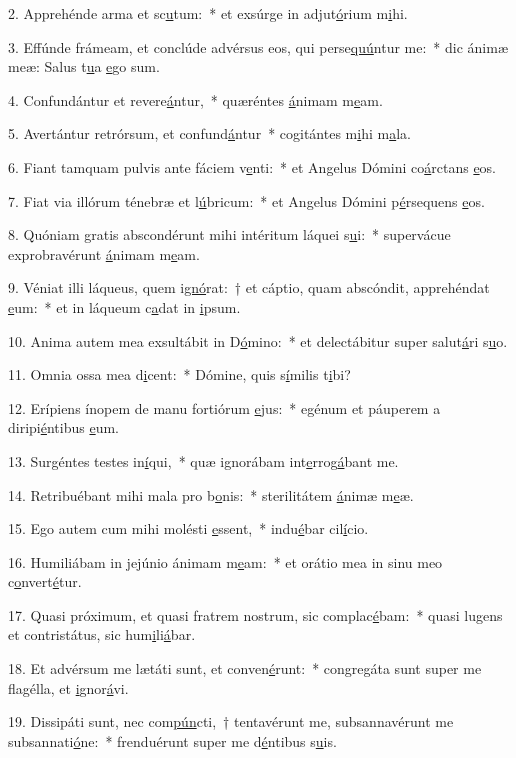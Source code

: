 2. Apprehénde arma et sc\uline{u}tum:~* et exsúrge in adjut\uline{ó}rium m\uline{i}hi.\par 
3. Effúnde frámeam, et conclúde advérsus eos, qui perse\uline{quú}ntur me:~* dic ánimæ meæ: Salus t\uline{u}a \uline{e}go sum.\par 
4. Confundántur et revere\uline{á}ntur,~* quæréntes \uline{á}nimam m\uline{e}am.\par 
5. Avertántur retrórsum, et confund\uline{á}ntur~* cogitántes m\uline{i}hi m\uline{a}la.\par 
6. Fiant tamquam pulvis ante fáciem v\uline{e}nti:~* et Angelus Dómini co\uline{á}rctans \uline{e}os.\par 
7. Fiat via illórum ténebræ et l\uline{ú}bricum:~* et Angelus Dómini p\uline{é}rsequens \uline{e}os.\par 
8. Quóniam gratis abscondérunt mihi intéritum láquei s\uline{u}i:~* supervácue exprobravérunt \uline{á}nimam m\uline{e}am.\par 
9. Véniat illi láqueus, quem i\uline{gnó}rat:~† et cáptio, quam abscóndit, apprehéndat \uline{e}um:~* et in láqueum c\uline{a}dat in \uline{i}psum.\par 
10. Anima autem mea exsultábit in D\uline{ó}mino:~* et delectábitur super salut\uline{á}ri s\uline{u}o.\par 
11. Omnia ossa mea d\uline{i}cent:~* Dómine, quis s\uline{í}milis t\uline{i}bi?\par 
12. Erípiens ínopem de manu fortiórum \uline{e}jus:~* egénum et páuperem a diripi\uline{é}ntibus \uline{e}um.\par 
13. Surgéntes testes in\uline{í}qui,~* quæ ignorábam int\uline{e}rrog\uline{á}bant me.\par 
14. Retribuébant mihi mala pro b\uline{o}nis:~* sterilitátem \uline{á}nimæ m\uline{e}æ.\par 
15. Ego autem cum mihi molésti \uline{e}ssent,~* indu\uline{é}bar cil\uline{í}cio.\par 
16. Humiliábam in jejúnio ánimam m\uline{e}am:~* et orátio mea in sinu meo c\uline{o}nvert\uline{é}tur.\par 
17. Quasi próximum, et quasi fratrem nostrum, sic complac\uline{é}bam:~* quasi lugens et contristátus, sic hum\uline{i}li\uline{á}bar.\par 
18. Et advérsum me lætáti sunt, et conven\uline{é}runt:~* congregáta sunt super me flagélla, et \uline{i}gnor\uline{á}vi.\par 
19. Dissipáti sunt, nec com\uline{pún}cti,~† tentavérunt me, subsannavérunt me subsannati\uline{ó}ne:~* frenduérunt super me d\uline{é}ntibus s\uline{u}is.\par 
